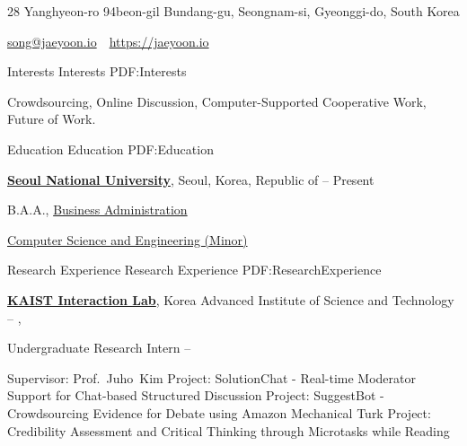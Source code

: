 \documentclass[letterpaper,MMMyyyy,nonstopmode]{template}
\newcommand{\CVAuthor}{Jaeyoon Song}
\newcommand{\CVWebpage}{https://jaeyoon.io}
\begin{document}

\Title{\CVAuthor}

\Gap
\begin{SubTitle}
  28 Yanghyeon-ro 94beon-gil Bundang-gu, Seongnam-si, Gyeonggi-do, South Korea
  \par

  \href{mailto:song@jaeyoon.io}
  {song@jaeyoon.io}
  \,\SubBulletSymbol\,
  \href{\CVWebpage}
  {\url{\CVWebpage}}
\end{SubTitle}
  


\begin{Body}

  
\BigGap
\Section
{Interests}
{Interests}
{PDF:Interests}

\Entry
Crowdsourcing,
Online Discussion,
Computer-Supported Cooperative Work,
Future of Work.



\BigGap
\Section
{Education}
{Education}
{PDF:Education}

\Entry
\href{http://www.snu.ac.kr}
{\textbf{Seoul National University}},
Seoul, Korea, Republic of
\hfill
{} --
Present

\Gap
\BulletItem
B.A.A.,
\href{http://cba.snu.ac.kr}
{Business Administration}

\Gap
\BulletItem
\href{http://cse.snu.ac.kr}
{Computer Science and Engineering (Minor)}

\BigGap
\Section
{Research Experience}
{Research Experience}
{PDF:ResearchExperience}

\Entry
\href{https://www.kixlab.org}
{\textbf{KAIST Interaction Lab}},
Korea Advanced Institute of Science and Technology
\hfill
{} -- 
,

\Gap
\BulletItem
Undergraduate Research Intern
\hfill
{} --

\Gap
\begin{Detail}
\SubBulletItem
Supervisor:
Prof.~Juho~Kim
\SubBulletItem
Project:
SolutionChat - Real-time Moderator Support for Chat-based Structured Discussion
\SubBulletItem
Project:
SuggestBot - Crowdsourcing Evidence for Debate using Amazon Mechanical Turk
\SubBulletItem
Project:
Credibility Assessment and Critical Thinking through Microtasks while Reading
\end{Detail}


\end{Body}
\end{document}
